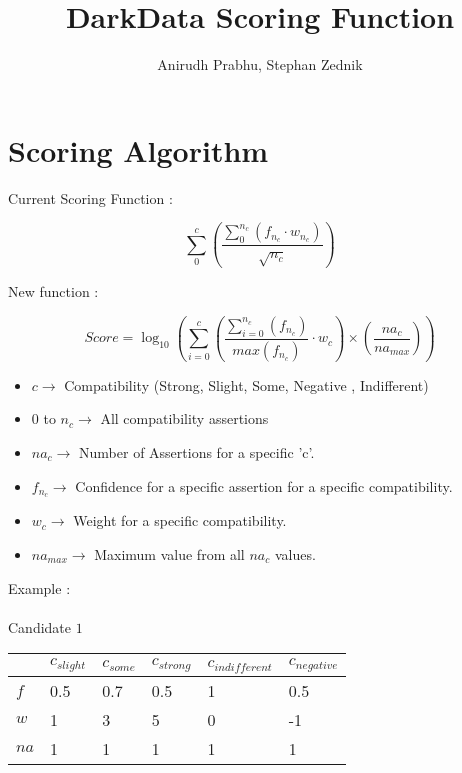 \documentclass[11pt]{article}
\begin{document}
\title{DarkData Scoring Function}
\author{Anirudh Prabhu, Stephan Zednik}
\maketitle

\section{Scoring Algorithm}


\begin{large}

Current Scoring Function : 

$$ \sum^{c}_{0}\left(   \frac{\sum^{n_{c}}_{0} (f_{n_{c}} \cdot w_{n_{c}})}{\sqrt{n_{c}}} \right) $$

New function : 

$$ Score = \log_{10}  \left( \sum^{c}_{i=0}\left(  \frac{\sum^{n_{c}}_{i=0} \left( f_{n_{c}}   \right) }{max \left( f_{n_{c}}   \right)}  \cdot w_{c}  \right) \times \left( \frac{na_{c}}{na_{max}}\right)\right)   $$

\begin{itemize}

\item $c \longrightarrow $ Compatibility (Strong, Slight, Some, Negative , Indifferent)

\item $0$ to $n_{c} \longrightarrow $ All compatibility assertions

\item $na_{c} \longrightarrow $ Number of Assertions for a specific 'c'.

\item $f_{n_{c}} \longrightarrow $ Confidence for a specific assertion for a specific compatibility.

\item $w_{c} \longrightarrow $ Weight for a specific compatibility.

\item $na_{max} \longrightarrow $ Maximum value from all $na_{c}$ values.


\end{itemize}



Example : \\ \\
Candidate $1$ \\
\begin{tabular}{|l|l|l|l|l|l|}
\hline
  & $c_{slight}$  & $c_{some}$  & $c_{strong}$  & $c_{indifferent}$ & $c_{negative}$  \\ \hline
$f$ & 0.5 & 0.7 & 0.5 & 1  & 0.5 \\ \hline
$w$ & 1   & 3   & 5   & 0  & -1  \\ \hline
$na$ & 1  & 1  & 1  & 1 & 1  \\ \hline
\end{tabular} 


\end{large}
\end{document}
